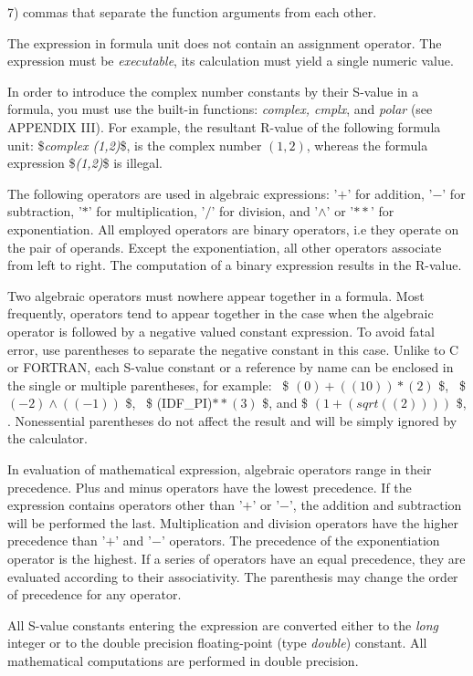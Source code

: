 7) commas that separate the function arguments from each other.

The expression in formula unit does not contain an assignment operator.
The expression must be {\it executable}, its calculation must yield
a single numeric value.

In order to introduce
the complex number constants by their S-value in a formula,
you must use the built-in functions:
{\it complex, cmplx}, and {\it polar}
(see APPENDIX III). 
For example, the resultant R-value of the following formula unit:
\${\it complex (1,2)}\$, is the complex number $(1,2)$,
whereas the formula expression \${\it (1,2)}\$
is illegal.

The following operators are used in
algebraic expressions:
'$+$' for addition,
'$-$' for subtraction,
'$*$' for multiplication,
'$/$' for division,
and '$\wedge$' or '$**$' for exponentiation.
All employed operators are binary operators, i.e they operate on the pair
of operands. Except the exponentiation, all other operators associate
from left to right. 
The computation of a binary expression results in the R-value.

Two algebraic operators must nowhere appear together in a formula.
Most frequently, operators tend to appear together in the case 
when the algebraic operator is followed by a negative valued constant
expression. To avoid fatal error, use parentheses to separate the negative constant in this case. Unlike to C or FORTRAN, each S-value constant
or a reference by name can be enclosed in the single or multiple
parentheses, for example: 
{
\ \$ $(0) + ((10))*(2)$ \$, \ \$ $(-2)\wedge((-1))$ \$,
\ \$ (IDF\_PI)$**(3)$ \$, and \$ $(1 + (sqrt((2))))$ \$,
}.
Nonessential parentheses do not affect the result and 
will be simply ignored by the calculator. 

In evaluation of mathematical expression, 
algebraic operators range in their precedence.
Plus and minus operators have the lowest precedence.
If the expression contains  operators other than '$+$' or '$-$',
the addition and subtraction will be performed the last.
Multiplication and division operators have the higher precedence than
'$+$' and '$-$' operators. The precedence of the exponentiation operator
is the highest.
If a series of operators have an equal precedence,
they are evaluated according to their associativity.
The parenthesis may change the order of precedence for any operator.

All S-value constants entering the expression are converted 
either to the {\it long} integer
or to the double precision floating-point (type {\it double}) constant.
All mathematical computations are performed in double precision.

